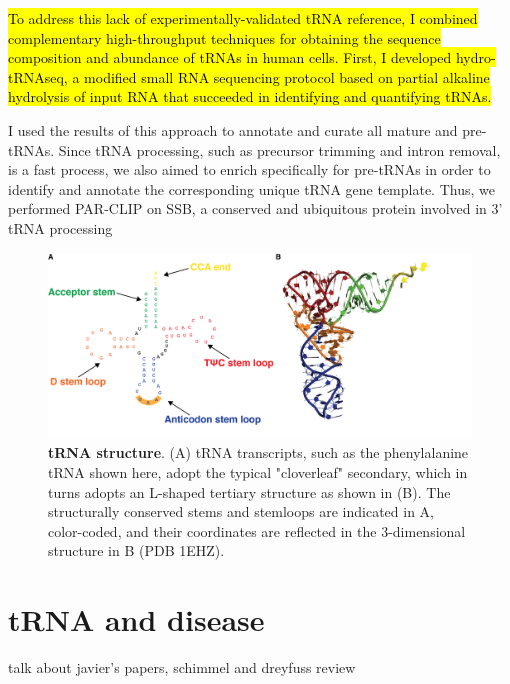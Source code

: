 \documentclass[12pt]{rockefeller}
\begin{document}
\hl{To address this lack of experimentally-validated tRNA reference, I combined complementary high-throughput techniques for obtaining the sequence composition and abundance of tRNAs in human cells. First, I developed hydro-tRNAseq, a modified small RNA sequencing protocol based on partial alkaline hydrolysis of input RNA that succeeded in identifying and quantifying tRNAs.}

I used the results of this approach to annotate and curate all mature and pre-tRNAs. Since tRNA processing, such as precursor trimming and intron removal, is a fast process\cite{Foretek:2016ea}, we also aimed to enrich specifically for pre-tRNAs in order to identify and annotate the corresponding unique tRNA gene template. Thus, we performed PAR-CLIP on SSB, a conserved and ubiquitous protein involved in 3’ tRNA processing \cite{Bayfield:2009cx,Bayfield:2010cs,Stefano:1984wp}

\begin{figure}[!ht]%
\centering
\includegraphics[width=\textwidth]{tRNA_general_structure.png}%
\caption[tRNA structure]{\textbf{tRNA structure}. (A) tRNA transcripts, such as the phenylalanine tRNA shown here, adopt the typical "cloverleaf" secondary, which in turns adopts an L-shaped tertiary structure as shown in (B). The structurally conserved stems and stemloops are indicated in A, color-coded, and their coordinates are reflected in the 3-dimensional structure in B (PDB 1EHZ).
}
\label{tRNAstructure}%
\end{figure}

\section{tRNA and disease} 
talk about javier's papers, schimmel and dreyfuss review
\end{document}
